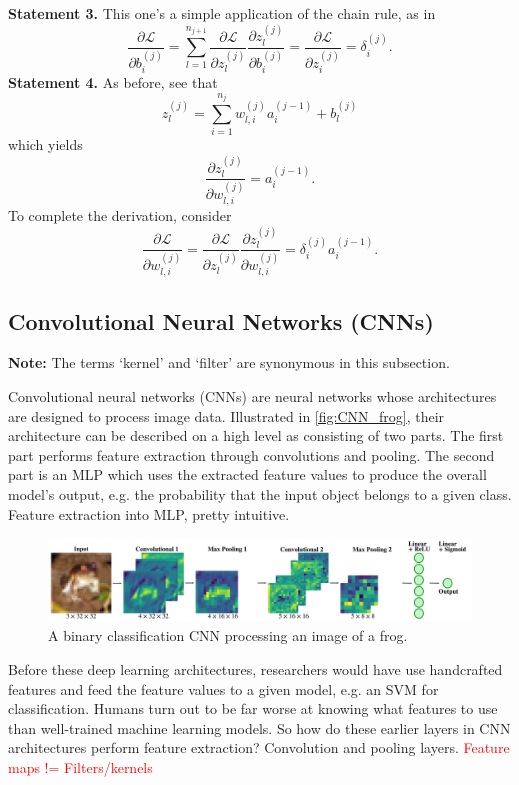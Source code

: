 \documentclass[11pt]{article}
\begin{document}
\vspace{10pt}
\noindent\textbf{Statement 3.} This one's a simple application of the chain rule, as in
$$
\frac{\partial\mathcal{L}}{\partial b_i^{(j)}}
=
\sum_{l=1}^{n_{j+1}}\frac{\partial\mathcal{L}}{\partial z_l^{(j)}}\frac{\partial z_l^{(j)}}{\partial b_i^{(j)}}
=
\frac{\partial\mathcal{L}}{\partial z_i^{(j)}}
=
\delta_i^{(j)}.
$$
\textbf{Statement 4.} As before, see that
$$
z_l^{(j)}
=
\sum_{i=1}^{n_j}w_{l,i}^{(j)}a_i^{(j-1)}+b_l^{(j)}
$$
which yields
$$
\frac{\partial z_l^{(j)}}{\partial w_{l,i}^{(j)}}
=
a_i^{(j-1)}.
$$
To complete the derivation, consider
$$
\frac{\partial\mathcal{L}}{\partial w_{l,i}^{(j)}}
=
\frac{\partial\mathcal{L}}{\partial z_l^{(j)}}\frac{\partial z_l^{(j)}}{\partial w_{l,i}^{(j)}}
=
\delta_i^{(j)}a_i^{(j-1)}.
$$

\subsection{Convolutional Neural Networks (CNNs)}
\label{subsec:conv_neural_networks}

\textbf{Note:} The terms `kernel' and `filter' are synonymous in this subsection.

\vspace{14pt}
\noindent Convolutional neural networks (CNNs) are neural networks whose architectures are designed to process image data. Illustrated in \autoref{fig:CNN_frog}, their architecture can be described on a high level as consisting of two parts. The first part performs feature extraction through convolutions and pooling. The second part is an MLP which uses the extracted feature values to produce the overall model's output, e.g. the probability that the input object belongs to a given class. Feature extraction into MLP, pretty intuitive.

\begin{figure}[ht]
    \centering
    \includegraphics[width=1\textwidth]{./figures/neural_nets/CNN_frog.pdf}
    \caption{A binary classification CNN processing an image of a frog.}
    \label{fig:CNN_frog}
\end{figure}

Before these deep learning architectures, researchers would have use handcrafted features and feed the feature values to a given model, e.g. an SVM for classification. Humans turn out to be far worse at knowing what features to use than well-trained machine learning models. So how do these earlier layers in CNN architectures perform feature extraction? Convolution and pooling layers. \textcolor{red}{Feature maps != Filters/kernels}
\end{document}
